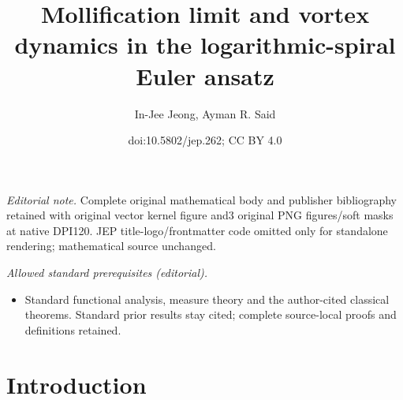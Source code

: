\documentclass[10pt]{amsart}
\title{Mollification limit and vortex dynamics in the logarithmic-spiral Euler ansatz}
\author{In-Jee Jeong, Ayman R. Said}
\date{doi:10.5802/jep.262; CC BY 4.0}
\theoremstyle{plain}
\theoremstyle{definition}
\begin{document}
\maketitle
\noindent\textit{Editorial note.} Complete original mathematical body and publisher bibliography retained with original vector kernel figure and3 original PNG figures/soft masks at native DPI120. JEP title-logo/frontmatter code omitted only for standalone rendering; mathematical source unchanged.\par\medskip
\noindent\textit{Allowed standard prerequisites (editorial).}\begin{itemize}
\item Standard functional analysis, measure theory and the author-cited classical theorems. Standard prior results stay cited; complete source-local proofs and definitions retained.
\end{itemize}\medskip
\vspace*{-.1\baselineskip}
\tableofcontents


\section{Introduction}
\end{document}
